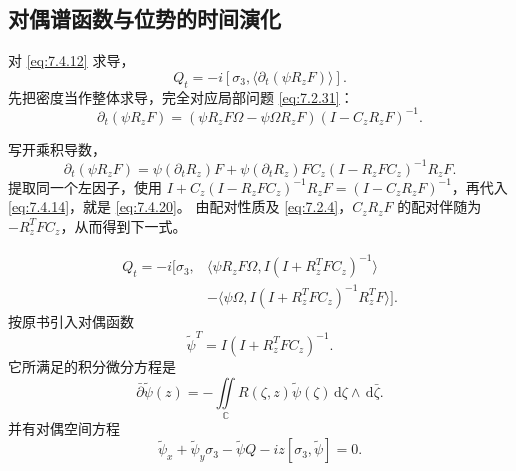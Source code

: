 \documentclass[lang=cn,scheme=chinese,mode=simple,device=normal,color=blue,math=cm,thmcnt=section,12pt]{elegantbook}
\newcommand{\dd}{\,\mathrm{d}}
\newcommand{\eqq}[2]{\tag{#1}\label{eq:#1}#2}
\begin{document}
\subsection{对偶谱函数与位势的时间演化}
对 \eqref{eq:7.4.12} 求导，
\begin{equation}
\eqq{7.4.19}{Q_t=-i[\sigma_3,\langle\partial_t(\psi R_zF)\rangle].}
\end{equation}
先把密度当作整体求导，完全对应局部问题 \eqref{eq:7.2.31}：
\begin{equation}
\eqq{7.4.20}{\partial_t(\psi R_zF)=(\psi R_zF\Omega-\psi\Omega R_zF)(I-C_zR_zF)^{-1}.}
\end{equation}
\begin{callout}[计算：密度求导后的逆算子为何在这个位置]
写开乘积导数，
\[
\partial_t(\psi R_zF)=\psi(\partial_tR_z)F
+\psi(\partial_tR_z)FC_z(I-R_zFC_z)^{-1}R_zF.
\]
提取同一个左因子，使用
$I+C_z(I-R_zFC_z)^{-1}R_zF=(I-C_zR_zF)^{-1}$，再代入 \eqref{eq:7.4.14}，就是 \eqref{eq:7.4.20}。
由配对性质及 \eqref{eq:7.2.4}，$C_zR_zF$ 的配对伴随为 $-R_z^TFC_z$，从而得到下一式。
\end{callout}
\begin{equation}
\eqq{7.4.21}{\begin{aligned}
Q_t=-i\bigl[\sigma_3,{}&\langle\psi R_zF\Omega,I(I+R_z^TFC_z)^{-1}\rangle\\
&-\langle\psi\Omega,I(I+R_z^TFC_z)^{-1}R_z^TF\rangle\bigr].
\end{aligned}}
\end{equation}
按原书引入对偶函数
\begin{equation}
\eqq{7.4.22}{\widetilde\psi^T=I(I+R_z^TFC_z)^{-1}.}
\end{equation}
它所满足的积分微分方程是
\begin{equation}
\eqq{7.4.23}{\bar\partial\widetilde\psi(z)=-\iint\limits_{\mathbb C}R(\zeta,z)\widetilde\psi(\zeta)\dd\zeta\wedge\dd\bar\zeta.}
\end{equation}
并有对偶空间方程
\begin{equation}
\eqq{7.4.24}{\widetilde\psi_x+\widetilde\psi_y\sigma_3-\widetilde\psi Q-iz[\sigma_3,\widetilde\psi]=0.}
\end{equation}
\end{document}
